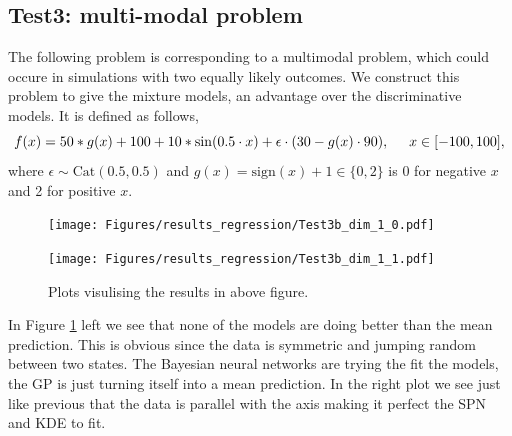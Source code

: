 \subsection*{Test3: multi-modal problem}
The following problem is corresponding to a multimodal problem, which could occure in simulations with
two equally likely outcomes. We construct this problem to give the mixture models, 
an advantage over the discriminative models. It is defined as follows, 
$$f(x) = 50*g(x)+ 100 + 10*\sin(0.5\cdot x) + \epsilon \cdot (30 - g(x) \cdot 90), \hspace*{0.5cm}x \in
[-100,100],$$ 
where $\epsilon \sim \text{Cat}(0.5,0.5)$ and $g(x) = \text{sign}(x)+1 \in \{0,2\}$
is 0 for negative $x$ and 2 for positive $x$.

\begin{figure}[H]
  \centering
  \begin{minipage}[b]{0.49\textwidth}
   \texttt{[image: Figures/results\_regression/Test3b\_dim\_1\_0.pdf]}
  \end{minipage}
  \hfill
  \begin{minipage}[b]{0.49\textwidth}
    \texttt{[image: Figures/results\_regression/Test3b\_dim\_1\_1.pdf]}
   \end{minipage}
  \caption{Plots visulising the results in above figure.}
  \label{Test3_reg_plot}
\end{figure}

In Figure \ref{Test3_reg_plot} left we see that none of the models are doing better than the mean
prediction. This is obvious since the data is symmetric and jumping random between two states. The
Bayesian neural networks are trying the fit the models, the GP is just turning itself into a mean
prediction. In the right plot we see just like previous that the data is parallel with the axis making it perfect
the SPN and KDE to fit. 


